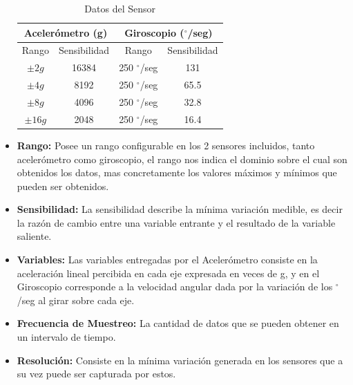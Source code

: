 \documentclass[12pt,a4paper]{article}
\newcommand{\grad}{$^{\circ}$}
\begin{document}
\begin{itemize}

\begin{table}[H]
  \centering
  \caption{Datos del Sensor}
  \begin{tabular}{|c|c|c|c|}
  \hline
  \multicolumn{2}{|c|}{Acelerómetro (g)} &\multicolumn{2}{|c|}{Giroscopio (\grad/seg)}   \\
  \hline
  Rango        & Sensibilidad   & Rango      & Sensibilidad \\ \hline
  $\pm 2g$     &  16384 & 250 \grad/seg  & 131      	\\ 
  $\pm 4g$     &  8192  & 250 \grad/seg  & 65.5      	\\
  $\pm 8g$     &  4096  & 250 \grad/seg  & 32.8      	\\
  $\pm 16g$    &  2048  & 250 \grad/seg  & 16.4      	\\ \hline
  \end{tabular}
\end{table}

\item \textbf{Rango:} Posee un rango configurable en los 2 sensores incluidos, tanto acelerómetro como giroscopio, el rango nos indica el dominio sobre el cual son obtenidos los datos, mas concretamente los valores máximos y mínimos que pueden ser obtenidos.
	
\item \textbf{Sensibilidad: }La sensibilidad describe la mínima variación medible, es decir la razón de cambio entre una variable entrante y el resultado de la variable saliente.

\item \textbf{Variables: } Las variables entregadas por el Acelerómetro consiste en la aceleración lineal percibida en cada eje expresada en veces de g, y en el Giroscopio corresponde  a la velocidad angular dada por la variación de los \grad/seg al girar sobre cada eje.

\item \textbf{Frecuencia de Muestreo: } La cantidad de datos que se pueden obtener en un intervalo de tiempo.

\item \textbf{Resolución: } Consiste en la mínima variación generada en los sensores que a su vez puede ser capturada por estos.

\end{itemize}
\end{document}
